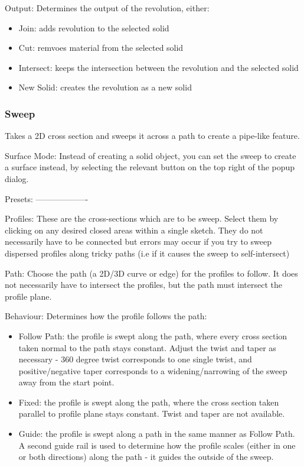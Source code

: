 Output:
Determines the output of the revolution, either:
\begin{itemize}
    \item Join: adds revolution to the selected solid
    \item Cut: remvoes material from the selected solid
    \item Intersect: keeps the intersection between the revolution and the selected solid
    \item New Solid: creates the revolution as a new solid
\end{itemize}

\subsubsection{Sweep}
Takes a 2D cross section and sweeps it across a path to create a pipe-like feature.

Surface Mode:
Instead of creating a solid object, you can set the sweep to create a surface instead, by selecting the relevant button on the top right of the popup dialog.

Presets:
-------------------

Profiles:
These are the cross-sections which are to be sweep. Select them by clicking on any desired closed areas within a single sketch. They do not necessarily have to be connected but errors may occur if you try to sweep dispersed profiles along tricky paths (i.e if it causes the sweep to self-intersect)

Path:
Choose the path (a 2D/3D curve or edge) for the profiles to follow. It does not necessarily have to intersect the profiles, but the path must intersect the profile plane.

Behaviour:
Determines how the profile follows the path:

\begin{itemize}
    \item Follow Path: the profile is swept along the path, where every cross section taken normal to the path stays constant. Adjust the twist and taper as necessary - 360 degree twist corresponds to one single twist, and positive/negative taper corresponds to a widening/narrowing of the sweep away from the start point.
    \item Fixed: the profile is swept along the path, where the cross section taken parallel to profile plane stays constant. Twist and taper are not available.
    \item Guide: the profile is swept along a path in the same manner as Follow Path. A second guide rail is used to determine how the profile scales (either in one or both directions) along the path - it guides the outside of the sweep.
\end{itemize}


